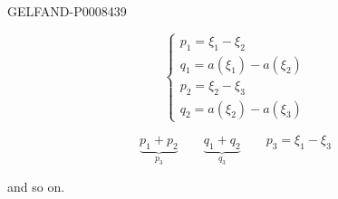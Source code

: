 \begin{GelfandAdjacentEvidence}{GELFAND-P000843}{9}


\begin{equation*}
\begin{cases}
p_1=\xi_1-\xi_2\\
q_1=a(\xi_1)-a(\xi_2)\\
p_2=\xi_2-\xi_3\\
q_2=a(\xi_2)-a(\xi_3)
\end{cases}
\tag{4}
\end{equation*}

\[
\underbrace{p_1+p_2}_{p_3}\qquad
\underbrace{q_1+q_2}_{q_3}\qquad
p_3=\xi_1-\xi_3
\]

and so on.
\end{GelfandAdjacentEvidence}



